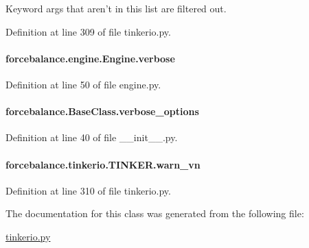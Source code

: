 Keyword args that aren't in this list are filtered out. 



Definition at line 309 of file tinkerio.\-py.

\hypertarget{classforcebalance_1_1engine_1_1Engine_a29b97ebf8984e50fd19eb831715ab659}{
\paragraph[{verbose}]{\setlength{\rightskip}{0pt plus 5cm}forcebalance.\-engine.\-Engine.\-verbose\hspace{0.3cm}{\ttfamily [inherited]}}}\label{classforcebalance_1_1engine_1_1Engine_a29b97ebf8984e50fd19eb831715ab659}


Definition at line 50 of file engine.\-py.

\hypertarget{classforcebalance_1_1BaseClass_afd68efa29ccd2f320f4cf82198214aac}{
\paragraph[{verbose\-\_\-options}]{\setlength{\rightskip}{0pt plus 5cm}forcebalance.\-Base\-Class.\-verbose\-\_\-options\hspace{0.3cm}{\ttfamily [inherited]}}}\label{classforcebalance_1_1BaseClass_afd68efa29ccd2f320f4cf82198214aac}


Definition at line 40 of file \-\_\-\-\_\-init\-\_\-\-\_\-.\-py.

\hypertarget{classforcebalance_1_1tinkerio_1_1TINKER_accc63c58abe79aea21fb74b1b6f99214}{
\paragraph[{warn\-\_\-vn}]{\setlength{\rightskip}{0pt plus 5cm}forcebalance.\-tinkerio.\-T\-I\-N\-K\-E\-R.\-warn\-\_\-vn}}\label{classforcebalance_1_1tinkerio_1_1TINKER_accc63c58abe79aea21fb74b1b6f99214}


Definition at line 310 of file tinkerio.\-py.



The documentation for this class was generated from the following file\-:\begin{DoxyCompactItemize}
\item 
\hyperlink{tinkerio_8py}{tinkerio.\-py}\end{DoxyCompactItemize}
